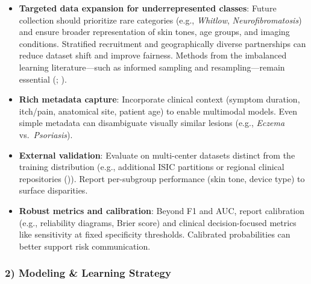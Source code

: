 \documentclass[
  12pt,
  oneside]{article}
\providecommand{\tightlist}{%
  \setlength{\itemsep}{0pt}\setlength{\parskip}{0pt}}
\begin{document}
\begin{itemize}
\tightlist
\item
  \textbf{Targeted data expansion for underrepresented classes}: Future
  collection should prioritize rare categories (e.g., \emph{Whitlow},
  \emph{Neurofibromatosis}) and ensure broader representation of skin
  tones, age groups, and imaging conditions. Stratified recruitment and
  geographically diverse partnerships can reduce dataset shift and
  improve fairness. Methods from the imbalanced learning
  literature---such as informed sampling and resampling---remain
  essential (;
  ).
\item
  \textbf{Rich metadata capture}: Incorporate clinical context (symptom
  duration, itch/pain, anatomical site, patient age) to enable
  multimodal models. Even simple metadata can disambiguate visually
  similar lesions (e.g., \emph{Eczema} vs.~\emph{Psoriasis}).
\item
  \textbf{External validation}: Evaluate on multi-center datasets
  distinct from the training distribution (e.g., additional ISIC
  partitions or regional clinical repositories
  ()). Report
  per-subgroup performance (skin tone, device type) to surface
  disparities.
\item
  \textbf{Robust metrics and calibration}: Beyond F1 and AUC, report
  calibration (e.g., reliability diagrams, Brier score) and clinical
  decision-focused metrics like sensitivity at fixed specificity
  thresholds. Calibrated probabilities can better support risk
  communication.
\end{itemize}

\subsubsection{2) Modeling \& Learning
Strategy}\label{modeling-learning-strategy}
\end{document}
